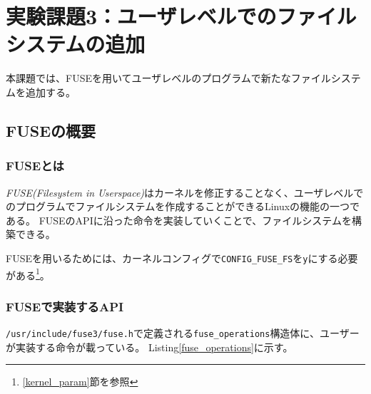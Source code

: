 \documentclass[main]{subfiles}
\begin{document}
\section{実験課題3：ユーザレベルでのファイルシステムの追加}

本課題では、FUSEを用いてユーザレベルのプログラムで新たなファイルシステムを追加する。

\subsection{FUSEの概要}
\label{about_fuse}

\subsubsection{FUSEとは}

\textit{FUSE(Filesystem in Userspace)}はカーネルを修正することなく、ユーザレベルでのプログラムでファイルシステムを作成することができるLinuxの機能の一つである。
FUSEのAPIに沿った命令を実装していくことで、ファイルシステムを構築できる。

FUSEを用いるためには、カーネルコンフィグで\texttt{CONFIG\_FUSE\_FS}を\texttt{y}にする必要がある\footnote{\ref{kernel_param}節を参照}。

\subsubsection{FUSEで実装するAPI}

\texttt{/usr/include/fuse3/fuse.h}で定義される\texttt{fuse\_operations}構造体に、ユーザーが実装する命令が載っている。
Listing\ref{fuse_operations}に示す。
\end{document}
